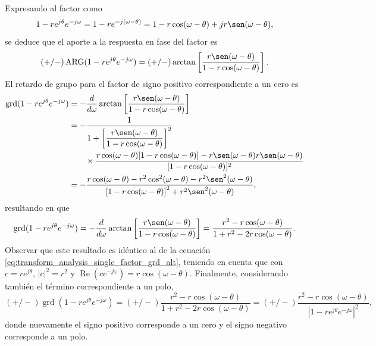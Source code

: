 \documentclass[a4paper]{report}
\renewcommand{\Re}{\operatorname{Re}}
\DeclareMathOperator{\ARG}{ARG}
\DeclareMathOperator{\grd}{grd}
\begin{document}
Expresando al factor como
\[
 1-re^{j\theta}e^{-j\omega}=1-re^{-j(\omega-\theta)}=1-r\cos(\omega-\theta)+jr\sen(\omega-\theta),
\]
se deduce que el aporte a la respuesta en fase del factor es
\begin{equation}\label{eq:transform_analysis_first_order_freq_response_phase}
 (+/-)\ARG(1-re^{j\theta}e^{-j\omega})=(+/-)\arctan\left[\frac{r\sen(\omega-\theta)}{1-r\cos(\omega-\theta)}\right]. 
\end{equation}
El retardo de grupo para el factor de signo positivo correspondiente a un cero es
\begin{align*}
 \grd(1-re^{j\theta}e^{-j\omega})&=-\frac{d}{d\omega}\arctan\left[\frac{r\sen(\omega-\theta)}{1-r\cos(\omega-\theta)}\right]\\ 
  &=-\dfrac{1}{1+\left[\dfrac{r\sen(\omega-\theta)}{1-r\cos(\omega-\theta)}\right]^2}\\
  &\qquad\times\frac{r\cos(\omega-\theta)[1-r\cos(\omega-\theta)]-r\sen(\omega-\theta)r\sen(\omega-\theta)}{[1-r\cos(\omega-\theta)]^2}\\
  &=-\dfrac{r\cos(\omega-\theta)-r^2\cos^2(\omega-\theta)-r^2\sen^2(\omega-\theta)}{\left[1-r\cos(\omega-\theta)\right]^2+r^2\sen^2(\omega-\theta)},
\end{align*}
resultando en que
\begin{equation}\label{eq:transform_analysis_first_order_freq_response_grd_alt}
 \grd(1-re^{j\theta}e^{-j\omega})=-\frac{d}{d\omega}\arctan\left[\frac{r\sen(\omega-\theta)}{1-r\cos(\omega-\theta)}\right]=\dfrac{r^2-r\cos(\omega-\theta)}{1+r^2-2r\cos(\omega-\theta)}. 
\end{equation}
Observar que este resultado es idéntico al de la ecuación \ref{eq:transform_analysis_single_factor_grd_alt}, teniendo en cuenta que con \(c=re^{j\theta}\), \(|c|^2=r^2\) y \(\Re(ce^{-j\omega})=r\cos(\omega-\theta)\). Finalmente, considerando también el término correspondiente a un polo,
\begin{equation}\label{eq:transform_analysis_first_order_freq_response_grd}
 (+/-)\grd(1-re^{j\theta}e^{-j\omega})=(+/-)\dfrac{r^2-r\cos(\omega-\theta)}{1+r^2-2r\cos(\omega-\theta)}
  =(+/-)\dfrac{r^2-r\cos(\omega-\theta)}{|1-re^{j\theta}e^{-j\omega}|^2}, 
\end{equation}
donde nuevamente el signo positivo corresponde a un cero y el signo negativo corresponde a un polo.
\end{document}
